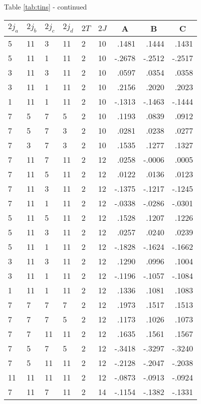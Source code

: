 \begin{center}{Table \ref{tab:tins} - continued}\end{center}
\clearpage
\small
\begin{center}
\begin{tabular}{llllllrrr}
\hline
$2j_{a}$&$2j_{b}$&$2j_{c}$&$2j_{d}$&$2T$&$2J$&
\multicolumn{1}{c}{A}&
\multicolumn{1}{c}{B}&
\multicolumn{1}{c}{C}
\\\hline
  5&11& 3&11& 2&10&   .1481&   .1444&   .1431\\
  5&11& 1&11& 2&10&  -.2678&  -.2512&  -.2517\\
  3&11& 3&11& 2&10&   .0597&   .0354&   .0358\\
  3&11& 1&11& 2&10&   .2156&   .2020&   .2023\\
  1&11& 1&11& 2&10&  -.1313&  -.1463&  -.1444\\
  7& 5& 7& 5& 2&10&   .1193&   .0839&   .0912\\
  7& 5& 7& 3& 2&10&   .0281&   .0238&   .0277\\
  7& 3& 7& 3& 2&10&   .1535&   .1277&   .1327\\
  7&11& 7&11& 2&12&   .0258&  -.0006&   .0005\\
  7&11& 5&11& 2&12&   .0122&   .0136&   .0123\\
  7&11& 3&11& 2&12&  -.1375&  -.1217&  -.1245\\
  7&11& 1&11& 2&12&  -.0338&  -.0286&  -.0301\\
  5&11& 5&11& 2&12&   .1528&   .1207&   .1226\\
  5&11& 3&11& 2&12&   .0257&   .0240&   .0239\\
  5&11& 1&11& 2&12&  -.1828&  -.1624&  -.1662\\
  3&11& 3&11& 2&12&   .1290&   .0996&   .1004\\
  3&11& 1&11& 2&12&  -.1196&  -.1057&  -.1084\\
  1&11& 1&11& 2&12&   .1336&   .1081&   .1083\\
  7& 7& 7& 7& 2&12&   .1973&   .1517&   .1513\\
  7& 7& 7& 5& 2&12&   .1173&   .1026&   .1073\\
  7& 7&11&11& 2&12&   .1635&   .1561&   .1567\\
  7& 5& 7& 5& 2&12&  -.3418&  -.3297&  -.3240\\
  7& 5&11&11& 2&12&  -.2128&  -.2047&  -.2038\\
 11&11&11&11& 2&12&  -.0873&  -.0913&  -.0924\\
  7&11& 7&11& 2&14&  -.1154&  -.1382&  -.1331\\
\hline
\end{tabular}
\end{center}
